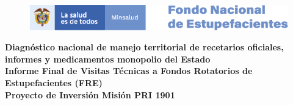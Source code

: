 \hypertarget{TitlePage}{}
\begin{center}
	\begin{figure}
		\centering
		\includegraphics[width=\linewidth]{www/logos_MinSalud_FNE.png}
	\end{figure}
	\thispagestyle{empty} 
	\vspace*{0.5cm}	
	\huge{\bfseries\sffamily\textbf{
			Diagnóstico nacional de manejo territorial de recetarios oficiales, informes y medicamentos monopolio del Estado}}\\[3.6cm]
	\Large{\bfseries\sffamily\textbf{
			Informe Final de Visitas Técnicas a Fondos Rotatorios de Estupefacientes (FRE)}}\\[3.6cm]	
	\Large{\bfseries\sffamily\textbf{
			Proyecto de Inversión Misión PRI 1901}}\\[3.7cm]
	\normalsize{}\\
\end{center}
